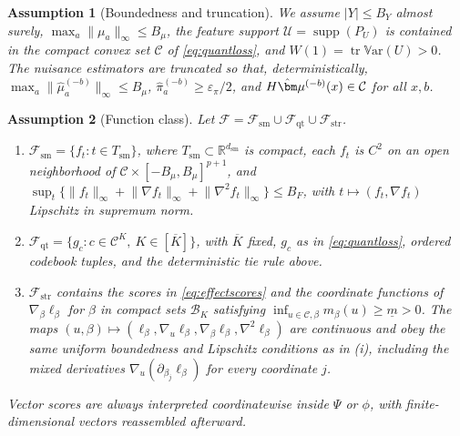 \documentclass[11pt]{article}
\newtheorem{assumption}{Assumption}
\newcommand{\R}{\mathbb R}
\newcommand{\Var}{\mathbb V\mathrm{ar}}
\newcommand{\supp}{\operatorname{supp}}
\newcommand{\tr}{\operatorname{tr}}
\newcommand{\calB}{\mathcal B}
\newcommand{\calC}{\mathcal C}
\newcommand{\calF}{\mathcal F}
\newcommand{\calU}{\mathcal U}
\newcommand{\bmu}{\bm\mu}
\newcommand{\eps}{\varepsilon}
\newcommand{\norm}[1]{\lVert #1\rVert}
\begin{document}
\begin{assumption}[Boundedness and truncation]\label{ass:bound}
We assume
$|Y|\le B_Y$ almost surely, $\max_a\norm{\mu_a}_\infty\le B_\mu$, the feature support $\calU=\supp(P_U)$ is contained in the compact convex set $\calC$ of \eqref{eq:quantloss}, and $W(1)=\tr\Var(U)>0$. The nuisance estimators are truncated so that, deterministically, $\max_a\norm{\hat\mu^{(-b)}_a}_\infty\le B_\mu$, $\hat\pi^{(-b)}_a\ge\eps_\pi/2$, and $H\hat\bmu^{(-b)}(x)\in\calC$ for all $x,b$.
\end{assumption} 

\begin{assumption}[Function class]
\label{ass:class}
Let $\calF=\calF_{\mathrm{sm}}\cup\calF_{\mathrm{qt}}\cup\calF_{\mathrm{str}}$.
\begin{enumerate}[label=(\roman*),leftmargin=2em]
\item $\calF_{\mathrm{sm}}=\{f_t:t\in T_{\mathrm{sm}}\}$, where
$T_{\mathrm{sm}}\subset\R^{d_{\mathrm{sm}}}$ is compact, each $f_t$ is $C^2$
on an open neighborhood of $\calC\times[-B_\mu,B_\mu]^{p+1}$, and $\sup_t\{\norm{f_t}_\infty+\norm{\nabla f_t}_\infty
+\norm{\nabla^2 f_t}_\infty\}\le B_F$,
with $t\mapsto(f_t,\nabla f_t)$ Lipschitz in supremum norm.
\item $\calF_{\mathrm{qt}}=\{g_c:c\in\calC^K,\ K\in[\overline K]\}$, with
$\overline K$ fixed, $g_c$ as in \eqref{eq:quantloss}, ordered codebook
tuples, and the deterministic tie rule above.
\item $\calF_{\mathrm{str}}$
contains the scores in \eqref{eq:effectscores} and the coordinate functions of
$\nabla_\beta\ell_\beta$ for $\beta$ in compact sets $\calB_K$ satisfying
$\inf_{u\in\calC,\beta}m_\beta(u)\ge\underline m>0$.  The maps $(u,\beta)\mapsto
(\ell_\beta,\nabla_u\ell_\beta,\nabla_\beta\ell_\beta,\nabla^2\ell_\beta)$
are continuous and obey the same uniform boundedness and Lipschitz conditions
as in \textup{(i)}, including the mixed derivatives
$\nabla_u(\partial_{\beta_j}\ell_\beta)$ for every coordinate $j$.
\end{enumerate}
Vector scores are always interpreted coordinatewise inside $\Psi$ or $\phi$, with
finite-dimensional vectors reassembled afterward.
\end{assumption}
\end{document}
